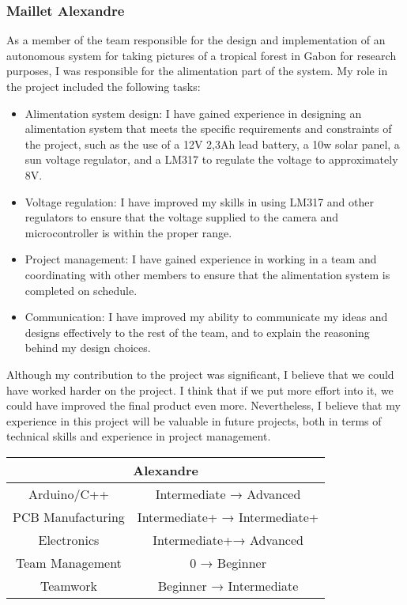 \newpage
\subsubsection*{Maillet Alexandre}
As a member of the team responsible for the design and implementation of an autonomous system for taking pictures of a tropical forest in Gabon for research purposes, I was responsible for the alimentation part of the system. My role in the project included the following tasks:

\begin{itemize}
\item Alimentation system design: I have gained experience in designing an alimentation system that meets the specific requirements and constraints of the project, such as the use of a 12V 2,3Ah lead battery, a 10w solar panel, a sun voltage regulator, and a LM317 to regulate the voltage to approximately 8V.
\item Voltage regulation: I have improved my skills in using LM317 and other regulators to ensure that the voltage supplied to the camera and microcontroller is within the proper range.
\item Project management: I have gained experience in working in a team and coordinating with other members to ensure that the alimentation system is completed on schedule.
\item Communication: I have improved my ability to communicate my ideas and designs effectively to the rest of the team, and to explain the reasoning behind my design choices.
\end{itemize}

Although my contribution to the project was significant, I believe that we could have worked harder on the project. I think that if we put more effort into it, we could have improved the final product even more. Nevertheless, I believe that my experience in this project will be valuable in future projects, both in terms of technical skills and experience in project management.\\


\begin{table}[!h]
    \centering
    \begin{tabular}{|cc|}
    \hline
    \multicolumn{2}{|c|}{\cellcolor[HTML]{FF0000}Alexandre}                 \\ \hline
    \multicolumn{1}{|c|}{Arduino/C++}       & Intermediate → Advanced       \\ \hline
    \multicolumn{1}{|c|}{PCB Manufacturing} & Intermediate+ → Intermediate+ \\ \hline
    \multicolumn{1}{|c|}{Electronics}       & Intermediate+→ Advanced       \\ \hline
    \multicolumn{1}{|c|}{Team Management}   & 0 → Beginner                  \\ \hline
    \multicolumn{1}{|c|}{Teamwork}          & Beginner → Intermediate       \\ \hline
    \end{tabular}
\end{table}